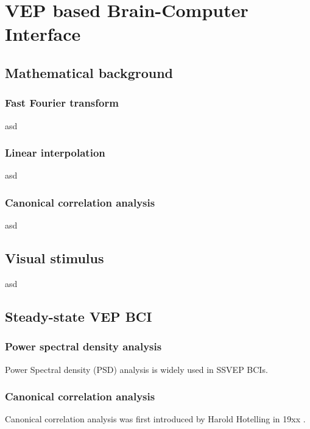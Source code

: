
\chapter{VEP based Brain-Computer Interface}
\section{Mathematical background}
\subsection{Fast Fourier transform}
asd
\subsection{Linear interpolation}
asd
\subsection{Canonical correlation analysis}
asd
\section{Visual stimulus}
asd
\section{Steady-state VEP BCI}
\subsection{Power spectral density analysis}
Power Spectral density (PSD) analysis is widely used in SSVEP BCIs\cite{bin2009cca}.
\subsection{Canonical correlation analysis}
Canonical correlation analysis was first introduced by Harold Hotelling in 19xx .